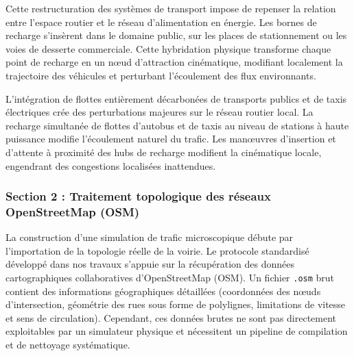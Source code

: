 \documentclass[10pt, a4paper]{article}
\begin{document}
Cette restructuration des systèmes de transport impose de repenser la
relation entre l'espace routier et le réseau d'alimentation en énergie.
Les bornes de recharge s'insèrent dans le domaine public, sur les places
de stationnement ou les voies de desserte commerciale. Cette hybridation
physique transforme chaque point de recharge en un nœud d'attraction
cinématique, modifiant localement la trajectoire des véhicules et
perturbant l'écoulement des flux environnants.

L'intégration de flottes entièrement décarbonées de transports publics
et de taxis électriques crée des perturbations majeures sur le réseau
routier local. La recharge simultanée de flottes d'autobus et de taxis
au niveau de stations à haute puissance modifie l'écoulement naturel du
trafic. Les manœuvres d'insertion et d'attente à proximité des hubs de
recharge modifient la cinématique locale, engendrant des congestions
localisées inattendues.

\subsubsection{Section 2 : Traitement topologique des réseaux
OpenStreetMap
(OSM)}\label{section-2-traitement-topologique-des-ruxe9seaux-openstreetmap-osm}

La construction d'une simulation de trafic microscopique débute par
l'importation de la topologie réelle de la voirie. Le protocole
standardisé développé dans nos travaux s'appuie sur la récupération des
données cartographiques collaboratives d'OpenStreetMap (OSM). Un fichier
\texttt{.osm} brut contient des informations géographiques détaillées
(coordonnées des nœuds d'intersection, géométrie des rues sous forme de
polylignes, limitations de vitesse et sens de circulation). Cependant,
ces données brutes ne sont pas directement exploitables par un
simulateur physique et nécessitent un pipeline de compilation et de
nettoyage systématique.
\end{document}
